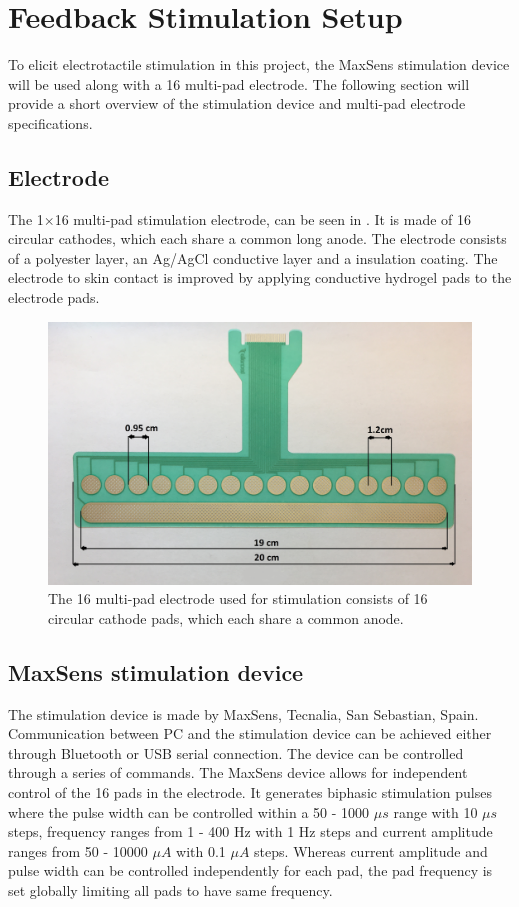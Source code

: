 \section{Feedback Stimulation Setup} \label{Maxxx}

To elicit electrotactile stimulation in this project, the MaxSens stimulation device will be used along with a 16 multi-pad electrode. The following section will provide a short overview of the stimulation device and multi-pad electrode specifications. 
 

\subsection{Electrode}

The 1$\times$16 multi-pad stimulation electrode, can be seen in . It is made of 16 circular cathodes, which each share a common long anode. The electrode consists of a polyester layer, an Ag/AgCl conductive layer and a insulation coating. The electrode to skin contact is improved by applying conductive hydrogel pads to the electrode pads. \cite{Strbac2016}     

\begin{figure}[H]                 
	\includegraphics[width=.57\textwidth]{figures/electrode}  
	\caption{The 16 multi-pad electrode used for stimulation consists of 16 circular cathode pads, which each share a common anode.}
	\label{fig:electrode} 
\end{figure}

\subsection{MaxSens stimulation device}

The stimulation device is made by MaxSens, Tecnalia, San Sebastian, Spain. Communication between PC and the stimulation device can be achieved either through Bluetooth or USB serial connection. The device can be controlled through a series of commands. The MaxSens device allows for independent control of the 16 pads in the electrode. It generates biphasic stimulation pulses where the pulse width can be controlled within a 50 - 1000 $\mu s$ range with 10 $\mu s$ steps, frequency ranges from 1 - 400 Hz with 1 Hz steps and current amplitude ranges from 50 - 10000 $\mu A$ with 0.1 $\mu A$ steps. Whereas current amplitude and pulse width can be controlled independently for each pad, the pad frequency is set globally limiting all pads to have same frequency.    